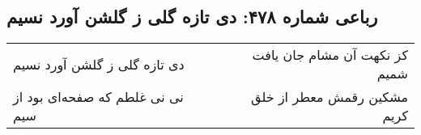 \begin{center}
\section*{رباعی شماره ۴۷۸: دی تازه گلی ز گلشن آورد نسیم}
\label{sec:sh478}
\begin{longtable}{l p{0.5cm} r}
دی تازه گلی ز گلشن آورد نسیم
&&
کز نکهت آن مشام جان یافت شمیم
\\
نی نی غلطم که صفحه‌ای بود از سیم
&&
مشکین رقمش معطر از خلق کریم
\\
\end{longtable}
\end{center}
